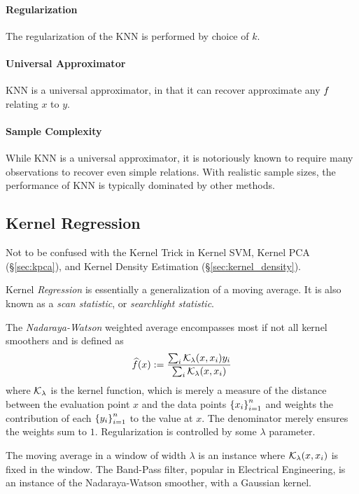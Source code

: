 \paragraph{Regularization}
The regularization of the KNN is performed by choice of $k$.

\paragraph{Universal Approximator}
KNN is a universal approximator, in that it can recover approximate any $f$ relating $x$ to $y$.

\paragraph{Sample Complexity}
While KNN is a universal approximator, it is notoriously known to require many observations to recover even simple relations. With realistic sample sizes, the performance of KNN is typically dominated by other methods.




\subsection{Kernel Regression}
\label{sec:kernel}

Not to be confused with the Kernel Trick in Kernel SVM, Kernel PCA (\S\ref{sec:kpca}), and Kernel Density Estimation (\S\ref{sec:kernel_density}).

Kernel \emph{Regression} is essentially a generalization of a moving average.
It is also known as a \emph{scan statistic}, or \emph{searchlight statistic}.

The \emph{Nadaraya-Watson} weighted average encompasses most if not all kernel smoothers and is defined as 
\begin{align}
\label{eq:nadaraya_watson}
	\widehat{f}(x):= \frac{\sum_i \mathcal{K}_\lambda(x,x_i)y_i}{\sum_i \mathcal{K}_\lambda(x,x_i)}
\end{align}
where $\mathcal{K}_\lambda$ is the kernel function, which is merely a measure of the distance between the evaluation point $x$ and the data points $\left\{  x_i  \right\}_{i=1}^n$ and weights the contribution of each $\left\{  y_i  \right\}_{i=1}^n$ to the value at $x$.
The denominator merely ensures the weights sum to $1$.
Regularization is controlled by some $\lambda$ parameter.

The moving average in a window of width $\lambda$ is an instance where $\mathcal{K}_\lambda(x,x_i)$ is fixed in the window.
The Band-Pass filter, popular in Electrical Engineering, is an instance of the Nadaraya-Watson smoother, with a Gaussian kernel. %



